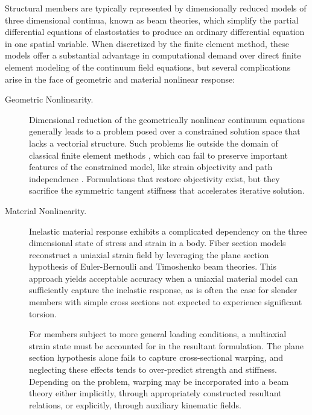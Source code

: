 Structural members are typically represented by dimensionally reduced \citep{kantorovich1958approximate} models of three dimensional continua, known as beam theories, which simplify the partial differential equations of elastostatics to produce an ordinary differential equation in one spatial variable.
When discretized by the finite element method, these models offer a substantial advantage in computational demand over direct finite element modeling of the continuum field equations, but several complications arise in the face of geometric and material nonlinear response:
\begin{description}
\item[Geometric Nonlinearity.]
Dimensional reduction of the geometrically nonlinear continuum equations generally leads to a problem posed over a constrained solution space that lacks a vectorial structure. 
Such problems lie outside the domain of classical finite element methods \citep{strang1973analysis}, which can fail to preserve important features of the constrained model, like strain objectivity and path independence \citep{jelenić1999geometrically}. 
Formulations that restore objectivity exist, but they sacrifice the symmetric tangent stiffness that accelerates iterative solution.

\item[Material Nonlinearity.]
Inelastic material response exhibits a complicated dependency on the three dimensional state of stress and strain in a body. 
Fiber section models reconstruct a uniaxial strain field by leveraging the plane section hypothesis of Euler-Bernoulli and Timoshenko beam theories. 
This approach yields acceptable accuracy when a uniaxial material model can sufficiently capture the inelastic response, as is often the case for slender members with simple cross sections not expected to experience significant torsion. 

For members subject to more general loading conditions, a multiaxial strain state must be accounted for in the resultant formulation. 
The plane section hypothesis alone fails to capture cross-sectional warping, and neglecting these effects tends to over-predict strength and stiffness. 
Depending on the problem, warping may be incorporated into a beam theory either implicitly, through appropriately constructed resultant relations, or explicitly, through auxiliary kinematic fields.



\end{description}
